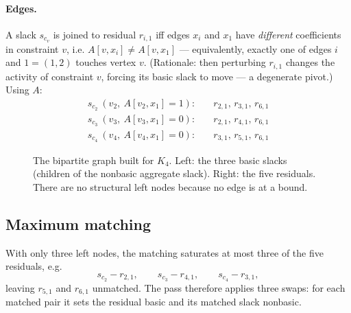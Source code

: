 \documentclass[11pt]{article}
\newcommand{\slack}[1]{s_{#1}}
\begin{document}
\paragraph{Edges.}
A slack $\slack{c_v}$ is joined to residual $r_{i,1}$ iff edges $x_i$ and $x_1$
have \emph{different} coefficients in constraint $v$, i.e. $A[v,x_i]\ne
A[v,x_1]$ --- equivalently, exactly one of edges $i$ and $1=(1,2)$ touches vertex
$v$. (Rationale: then perturbing $r_{i,1}$ changes the activity of constraint
$v$, forcing its basic slack to move --- a degenerate pivot.) Using $A$:
\[
\begin{aligned}
\slack{c_2}\ (v_2,\ A[v_2,x_1]=1):&\quad r_{2,1},\,r_{3,1},\,r_{6,1}\\
\slack{c_3}\ (v_3,\ A[v_3,x_1]=0):&\quad r_{2,1},\,r_{4,1},\,r_{6,1}\\
\slack{c_4}\ (v_4,\ A[v_4,x_1]=0):&\quad r_{3,1},\,r_{5,1},\,r_{6,1}
\end{aligned}
\]

\begin{figure}[h]
\centering
{}
\caption{The bipartite graph built for $K_4$. Left: the three basic slacks
(children of the nonbasic aggregate slack). Right: the five residuals. There are
no structural left nodes because no edge is at a bound.}
\label{fig:bip}
\end{figure}

\subsection*{Maximum matching}
With only three left nodes, the matching saturates at most three of the five
residuals, e.g.
\[
\slack{c_2}\!-\!r_{2,1},\qquad \slack{c_3}\!-\!r_{4,1},\qquad
\slack{c_4}\!-\!r_{3,1},
\]
leaving $r_{5,1}$ and $r_{6,1}$ unmatched. The pass therefore applies three
swaps: for each matched pair it sets the residual basic and its matched slack
nonbasic.
\end{document}
